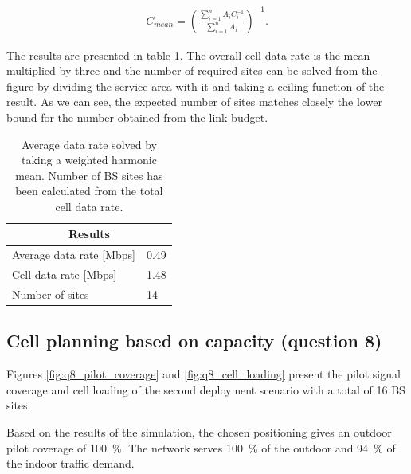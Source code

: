 \documentclass{article}
\begin{document}
\begin{gather*}
    C_{mean} = \left( \frac{\sum\limits_{i=1}^n A_i C_i^{-1}}{\sum\limits_{i=1}^n A_i} \right)^{-1}.
\end{gather*}

The results are presented in table \ref{tab:data_rates}. The overall cell data rate is the mean multiplied by three and the number of required sites can be solved from the figure by dividing the service area with it and taking a ceiling function of the result. As we can see, the expected number of sites matches closely the lower bound for the number obtained from the link budget.

\begin{table}[!htb]
    \centering
    \begin{tabular}{l|l|}
    \hline
    \multicolumn{2}{|c|}{\textbf{Results}} \\ \hline
    \multicolumn{1}{|l|}{Average data rate {[}Mbps{]}} & 0.49 \\ \hline
    \multicolumn{1}{|l|}{Cell data rate {[}Mbps{]}}    & 1.48 \\ \hline
    \multicolumn{1}{|l|}{Number of sites}              & 14   \\ \hline
    \end{tabular}
    \label{tab:data_rates}
    \caption{Average data rate solved by taking a weighted harmonic mean. Number of BS sites has been calculated from the total cell data rate.}
\end{table}

\newpage
\subsection{Cell planning based on capacity (question 8)}

Figures \ref{fig:q8_pilot_coverage} and \ref{fig:q8_cell_loading} present the pilot signal coverage and cell loading of the second deployment scenario with a total of 16 BS sites.

Based on the results of the simulation, the chosen positioning gives an outdoor pilot coverage of 100\ \%. The network serves 100\ \% of the outdoor and 94\ \% of the indoor traffic demand.
\end{document}
